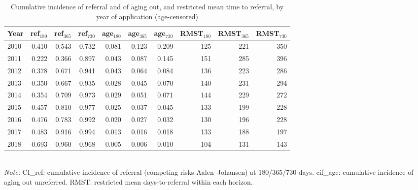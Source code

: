 \begin{table}[htbp]\centering
\caption{Cumulative incidence of referral and of aging out, and restricted mean time to referral, by year of application (age-censored)}
\label{tab:C1cde}
\footnotesize
\setlength{\tabcolsep}{4pt}
\begin{tabular}{lrrrrrrrrr}
\toprule
Year & ref$_{180}$ & ref$_{365}$ & ref$_{730}$ & age$_{180}$ & age$_{365}$ & age$_{730}$ & RMST$_{180}$ & RMST$_{365}$ & RMST$_{730}$ \\
\midrule
2010 & 0.410 & 0.543 & 0.732 & 0.081 & 0.123 & 0.209 & 125 & 221 & 350 \\
2011 & 0.222 & 0.366 & 0.897 & 0.043 & 0.087 & 0.145 & 151 & 285 & 396 \\
2012 & 0.378 & 0.671 & 0.941 & 0.043 & 0.064 & 0.084 & 136 & 223 & 286 \\
2013 & 0.350 & 0.667 & 0.935 & 0.028 & 0.045 & 0.070 & 140 & 231 & 294 \\
2014 & 0.354 & 0.709 & 0.973 & 0.029 & 0.051 & 0.071 & 144 & 229 & 272 \\
2015 & 0.457 & 0.810 & 0.977 & 0.025 & 0.037 & 0.045 & 133 & 199 & 228 \\
2016 & 0.476 & 0.783 & 0.992 & 0.020 & 0.027 & 0.032 & 130 & 196 & 228 \\
2017 & 0.483 & 0.916 & 0.994 & 0.013 & 0.016 & 0.018 & 133 & 188 & 197 \\
2018 & 0.693 & 0.960 & 0.968 & 0.005 & 0.006 & 0.010 & 104 & 131 & 143 \\
\bottomrule
\end{tabular}
\\[3pt]{\footnotesize \textit{Note:} CI\_ref: cumulative incidence of referral (competing-risks Aalen--Johansen) at 180/365/730 days. cif\_age: cumulative incidence of aging out unreferred. RMST: restricted mean days-to-referral within each horizon.}
\end{table}
